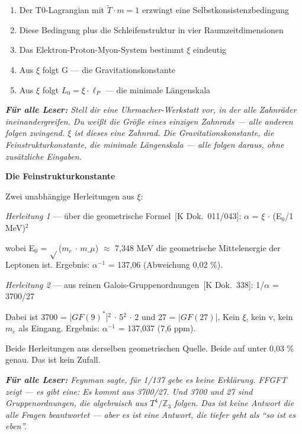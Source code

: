 \documentclass[11pt,oneside]{book}
\newcommand{\status}[1]{\penalty10000\,{\scriptsize\textcolor{gray!60}{[#1]}}}
\newenvironment{laierspur}{%
  \par\vspace{4pt}%
  \noindent\small\itshape\color{blue!60!black}%
  \textbf{Für alle Leser:}\enspace\ignorespaces}{%
  \par\vspace{4pt}\normalsize\normalfont\normalcolor}
\begin{document}
\begin{enumerate}
  \item Der T0-Lagrangian mit $\tilde{T}\cdot m=1$ erzwingt eine Selbstkonsistenzbedingung
  \item Diese Bedingung plus die Schleifenstruktur in vier Raumzeitdimensionen
  \item Das Elektron-Proton-Myon-System bestimmt $\xi$ eindeutig
  \item Aus $\xi$ folgt G — die Gravitationskonstante
  \item Aus $\xi$ folgt $L_0 = \xi \cdot \ell_P$ — die minimale Längenskala
\end{enumerate}

\begin{laierspur}
Stell dir eine Uhrmacher-Werkstatt vor, in der alle Zahnräder
ineinandergreifen. Du weißt die Größe eines einzigen Zahnrads — alle
anderen folgen zwingend. $\xi$ ist dieses eine Zahnrad. Die Gravitationskonstante,
die Feinstrukturkonstante, die minimale Längenskala — alle folgen daraus,
ohne zusätzliche Eingaben.
\end{laierspur}

\textbf{Die Feinstrukturkonstante}


Zwei unabhängige Herleitungen aus $\xi$:


\textit{Herleitung 1} — über die geometrische Formel \status{K Dok.~011/043}:
$\alpha$ = $\xi$ $\cdot$ (E$_0$/1 MeV)$^2$


wobei E$_0$ = $\sqrt{}$($m_e$ $\cdot$ $m\_\mu$) $\approx$ 7,348 MeV die geometrische Mittelenergie
der Leptonen ist. Ergebnis: $\alpha^{-1}$ = 137,06 (Abweichung 0,02 \%).


\textit{Herleitung 2} — aus reinen Galois-Gruppenordnungen \status{K Dok.~338}:
1/$\alpha$ = 3700/27


Dabei ist 3700 = |$GF(9)^*$|$^2$ $\cdot$ 5$^2$ $\cdot$ 2 und 27 = |$GF(27)$|. Kein $\xi$,
kein v, kein $m_e$ als Eingang. Ergebnis: $\alpha^{-1}$ = 137,037 (7,6 ppm).


Beide Herleitungen aus derselben geometrischen Quelle. Beide auf unter
0,03 \% genau. Das ist kein Zufall.


\begin{laierspur}
Feynman sagte, für 1/137 gebe es keine Erklärung. FFGFT zeigt — es gibt eine:
Es kommt aus 3700/27. Und 3700 und 27 sind Gruppenordnungen, die
algebraisch aus $T^4/\mathbb{Z}_3$ folgen. Das ist keine Antwort die alle Fragen
beantwortet — aber es ist eine Antwort, die tiefer geht als \enquote{so ist es eben}.
\end{laierspur}
\end{document}
